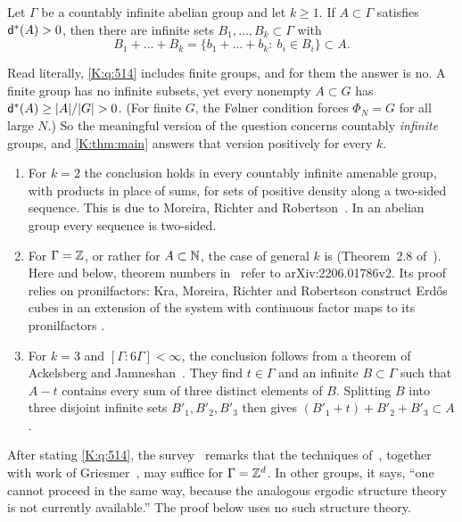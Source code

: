 \begin{theorem}\label{K:thm:main}
Let $\Gamma$ be a countably infinite abelian group and let $k\ge1$.
If $A\subset\Gamma$ satisfies $\mathsf{d}^*(A)>0$, then there are infinite sets
$B_1,\dots,B_k\subset\Gamma$ with
\[
B_1+\dots+B_k=\{b_1+\dots+b_k:\ b_i\in B_i\}\subset A .
\]
\end{theorem}

\begin{remark}\label{K:rem:finite}
Read literally, \cref{K:q:514} includes finite groups, and for them the answer is no.
A finite group has no infinite subsets, yet every nonempty $A\subset G$ has
$\ubd(A)\ge|A|/|G|>0$.
(For finite $G$, the Følner condition forces $\Phi_N=G$ for all large $N$.)
So the meaningful version of the question concerns countably \emph{infinite} groups, and
\cref{K:thm:main} answers that version positively for every $k$.
\end{remark}

\begin{remark}\label{K:rem:prior}
\leavevmode
\begin{enumerate}[label=(\alph*)]
\item For $k=2$ the conclusion holds in every countably infinite amenable group, with products in
place of sums, for sets of positive density along a two-sided \Fol{} sequence. This is due
to Moreira, Richter and Robertson~\cite[Theorem~1.3]{moreira2019proof}. In an abelian group
every \Fol{} sequence is two-sided.
\item For $\Gamma=\mathbb{Z}$, or rather for $A\subset\mathbb{N}$, the case of general $k$ is
\cite[Theorem~1.1]{kra2022infinite} (Theorem~2.8 of~\cite{kra2023problems}). Here and below,
theorem numbers in~\cite{kra2022infinite} refer to arXiv:2206.01786v2.
Its proof relies on pronilfactors: Kra, Moreira, Richter and Robertson construct Erdős
cubes in an extension of the system with continuous factor maps to its pronilfactors
\cite[Section~5]{kra2022infinite}.
\item For $k=3$ and $[\Gamma:6\Gamma]<\infty$, the conclusion follows from a theorem of Ackelsberg
and Jamneshan~\cite[Theorem~1.9]{ackelsberg2025equidistribution}. They find $t\in\Gamma$ and an
infinite $B\subset\Gamma$ such that $A-t$ contains every sum of three distinct elements of
$B$. Splitting $B$ into three disjoint infinite sets $B'_1,B'_2,B'_3$ then gives
$(B'_1+t)+B'_2+B'_3\subset A$.
\end{enumerate}
After stating \cref{K:q:514}, the survey~\cite{kra2023problems} remarks that the techniques
of~\cite{kra2022infinite}, together with work of Griesmer~\cite{griesmer2009ergodic}, may
suffice for $\Gamma=\mathbb{Z}^d$. In other groups, it says, ``one cannot
proceed in the same way, because the analogous ergodic structure theory is not currently
available.''
The proof below uses no such structure theory.
\end{remark}

